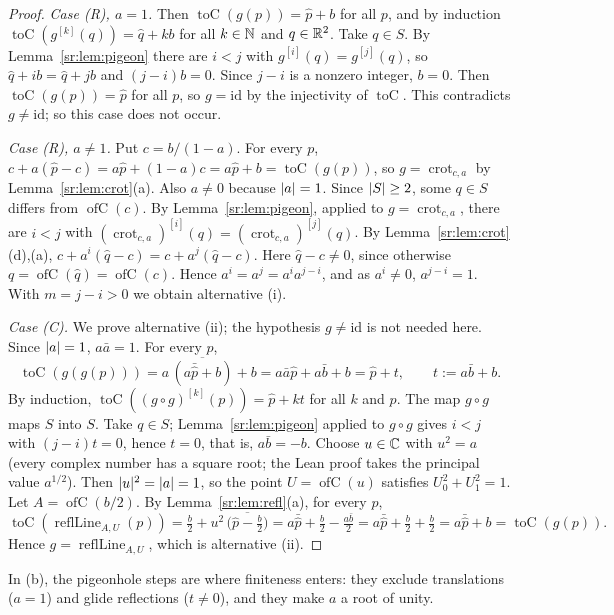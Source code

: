 \begin{proof}
\emph{Case (R), $a=1$.} Then $\operatorname{toC}(g(p))=\hat p+b$ for all $p$, and by induction
$\operatorname{toC}(g^{[k]}(q))=\hat q+kb$ for all $k\in\mathbb N$ and $q\in\mathbb R^2$. Take $q\in S$. By Lemma~\ref{sr:lem:pigeon}
there are $i<j$ with $g^{[i]}(q)=g^{[j]}(q)$, so $\hat q+ib=\hat q+jb$ and $(j-i)b=0$. Since $j-i$ is a nonzero
integer, $b=0$. Then $\operatorname{toC}(g(p))=\hat p$ for all $p$, so $g=\mathrm{id}$ by the injectivity of
$\operatorname{toC}$. This contradicts $g\ne\mathrm{id}$; so this case does not occur.

\emph{Case (R), $a\ne1$.} Put $c=b/(1-a)$. For every $p$, $c+a(\hat p-c)=a\hat p+(1-a)c=a\hat p+b=
\operatorname{toC}(g(p))$, so $g=\operatorname{crot}_{c,a}$ by Lemma~\ref{sr:lem:crot}(a). Also $a\ne0$ because
$\lvert a\rvert=1$. Since $\lvert S\rvert\ge2$, some $q\in S$ differs from $\operatorname{ofC}(c)$. By Lemma~\ref{sr:lem:pigeon},
applied to $g=\operatorname{crot}_{c,a}$, there are $i<j$ with $(\operatorname{crot}_{c,a})^{[i]}(q)=
(\operatorname{crot}_{c,a})^{[j]}(q)$. By Lemma~\ref{sr:lem:crot}(d),(a), $c+a^i(\hat q-c)=c+a^j(\hat q-c)$. Here
$\hat q-c\ne0$, since otherwise $q=\operatorname{ofC}(\hat q)=\operatorname{ofC}(c)$. Hence $a^i=a^j=a^ia^{j-i}$, and as
$a^i\ne0$, $a^{j-i}=1$. With $m=j-i>0$ we obtain alternative (i).

\emph{Case (C).} We prove alternative (ii); the hypothesis $g\ne\mathrm{id}$ is not needed here. Since $\lvert a\rvert=1$,
$a\bar a=1$. For every $p$,
\[
\operatorname{toC}(g(g(p)))=a\,\overline{(a\bar{\hat p}+b)}+b=a\bar a\hat p+a\bar b+b=\hat p+t,\qquad t:=a\bar b+b .
\]
By induction, $\operatorname{toC}((g\circ g)^{[k]}(p))=\hat p+kt$ for all $k$ and $p$. The map $g\circ g$ maps $S$ into
$S$. Take $q\in S$; Lemma~\ref{sr:lem:pigeon} applied to $g\circ g$ gives $i<j$ with $(j-i)t=0$, hence $t=0$, that is,
$a\bar b=-b$. Choose $u\in\mathbb C$ with $u^2=a$ (every complex number has a square root; the Lean proof takes the principal
value $a^{1/2}$). Then $\lvert u\rvert^2=\lvert a\rvert=1$, so the point $U=\operatorname{ofC}(u)$ satisfies $U_0^2+U_1^2=1$. Let
$A=\operatorname{ofC}(b/2)$. By Lemma~\ref{sr:lem:refl}(a), for every $p$,
\[
\operatorname{toC}(\operatorname{reflLine}_{A,U}(p))=\tfrac b2+u^2\,\overline{\bigl(\hat p-\tfrac b2\bigr)}
=a\bar{\hat p}+\tfrac b2-\tfrac{a\bar b}{2}=a\bar{\hat p}+\tfrac b2+\tfrac b2=a\bar{\hat p}+b=\operatorname{toC}(g(p)).
\]
Hence $g=\operatorname{reflLine}_{A,U}$, which is alternative (ii).
\end{proof}

In (b), the pigeonhole steps are where finiteness enters: they exclude translations ($a=1$) and glide reflections
($t\ne0$), and they make $a$ a root of unity.

